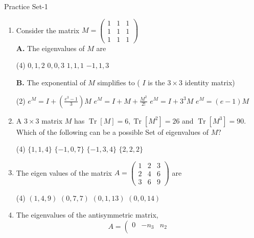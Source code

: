\begin{abox}
	Practice Set-1
	\end{abox}
\begin{enumerate}[label=\color{ocre}\textbf{\arabic*.}]
	\item Consider the matrix $M=\left(\begin{array}{lll}1 & 1 & 1 \\ 1 & 1 & 1 \\ 1 & 1 & 1\end{array}\right)$\\
	\textbf{A.} The eigenvalues of $M$ are
	{}
	\begin{tasks}(4)
		\task[\textbf{A.}] $0,1,2$
		\task[\textbf{B.}] $0,0,3$
		\task[\textbf{C.}] $1,1,1$
		\task[\textbf{D.}] $-1,1,3$
	\end{tasks}
	\textbf{B.} The exponential of $M$ simplifies to ( $I$ is the $3 \times 3$ identity matrix)
	\begin{tasks}(2)
		\task[\textbf{A.}] $e^{M}=I+\left(\frac{e^{3}-1}{3}\right) M$
		\task[\textbf{B.}] $e^{M}=I+M+\frac{M^{2}}{2 !}$
		\task[\textbf{C.}] $e^{M}=I+3^{3} M$
		\task[\textbf{D.}] $e^{M}=(e-1) M$
	\end{tasks}
	\item A $3 \times 3$ matrix $M$ has $\operatorname{Tr}[M]=6, \operatorname{Tr}\left[M^{2}\right]=26$ and $\operatorname{Tr}\left[M^{3}\right]=90$. Which of the following can be a possible Set of eigenvalues of $M ?$
	{}
	\begin{tasks}(4)
		\task[\textbf{A.}] $\{1,1,4\}$
		\task[\textbf{B.}] $\{-1,0,7\}$
		\task[\textbf{C.}] $\{-1,3,4\}$
		\task[\textbf{D.}] $\{2,2,2\}$
	\end{tasks}
	\item The eigen values of the matrix $A=\left(\begin{array}{lll}1 & 2 & 3 \\ 2 & 4 & 6 \\ 3 & 6 & 9\end{array}\right)$ are
	{}
	\begin{tasks}(4)
		\task[\textbf{A.}] $(1,4,9)$
		\task[\textbf{B.}] $(0,7,7)$
		\task[\textbf{C.}] $(0,1,13)$
		\task[\textbf{D.}] $(0,0,14)$
	\end{tasks}
	\item The eigenvalues of the antisymmetric matrix,
	$$
	A=\left(\begin{array}{ccc}
	0 & -n_{3} & n_{2} \\

\end{array}$$
\end{enumerate}
